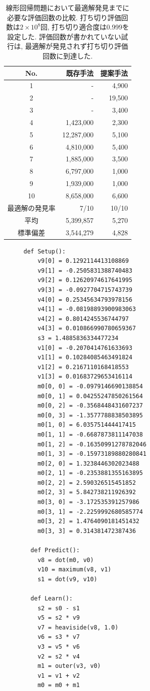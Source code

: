 \documentclass[11pt,oneside,openany,report]{jsbook}
\begin{document}
\begin{table}[tbp]
  \caption{線形回帰問題において最適解発見までに必要な評価回数の比較. 打ち切り評価回数は$2 \times 10^8$回, 打ち切り適合度は0.999を設定した. 評価回数が書かれていない試行は, 最適解が発見されず打ち切り評価回数に到達した.}
  \label{table:exp:result:linear}
  \centering
  \begin{tabular}{|c|r|r|}
    \hline
    No.  & 既存手法 & 提案手法  \\
    \hline \hline
    1       &  -  & 4,900 \\
    2       &  -  & 19,500  \\
    3       &  -  & 3,400 \\
    4       &  1,423,000  & 2,300 \\
    5       &  12,287,000  & 5,100  \\
    6       &  4,810,000 & 5,400  \\
    7       &  1,885,000 & 3,500  \\
    8       &  6,797,000 & 1,000 \\
    9       &  1,939,000  & 1,000 \\
    10      &  8,658,000  & 6,600 \\
    \hline
    最適解の発見率 & 7/10 & 10/10\\
    平均 & 5,399,857 &  5,270 \\
    標準偏差 & 3,544,279  & 4,828  \\
    \hline
  \end{tabular}
\end{table}

\begin{figure}[t]
  \begin{lstlisting}[caption=提案手法MGG-AutoML-Zero+VAGによって発見された非線形回帰のアルゴリズム,label=code:found_algorithm,basicstyle=\small\ttfamily]
  def Setup():
    v9[0] = 0.1292114413108869
    v9[1] = -0.2505831388740483
    v9[2] = 0.12620974617641995
    v9[3] = -0.0927704715743739
    v4[0] = 0.25345634793978156
    v4[1] = -0.08198893900983063
    v4[2] = 0.8014245536744797
    v4[3] = 0.010866990780659367
    s3 = 1.4885836334477234
    v1[0] = -0.2070414761633693
    v1[1] = 0.10284085463491824
    v1[2] = 0.2167110168418553
    v1[3] = 0.01683729653416114
    m0[0, 0] = -0.0979146690138854
    m0[0, 1] = 0.04255247850261564
    m0[0, 2] = -0.3568448431607237
    m0[0, 3] = -1.3577788838503895
    m0[1, 0] = 6.035751444417415
    m0[1, 1] = -0.6687873811147038
    m0[1, 2] = -0.16350991278782046
    m0[1, 3] = -0.15973189880280841
    m0[2, 0] = 1.3238446302023488
    m0[2, 1] = -0.2353881355163895
    m0[2, 2] = 2.590326515451852
    m0[2, 3] = 5.842738211926392
    m0[3, 0] = -3.172535391257986
    m0[3, 1] = -2.2259992680585774
    m0[3, 2] = 1.4764090181451432
    m0[3, 3] = 0.314381472387436

  def Predict():
    v8 = dot(m0, v0)
    v10 = maximum(v8, v1)
    s1 = dot(v9, v10)

  def Learn():
    s2 = s0 - s1
    v5 = s2 * v9
    v7 = heaviside(v8, 1.0)
    v6 = s3 * v7
    v3 = v5 * v6
    v2 = s2 * v4
    m1 = outer(v3, v0)
    v1 = v1 + v2
    m0 = m0 + m1
  \end{lstlisting}
  \end{figure}
\end{document}
